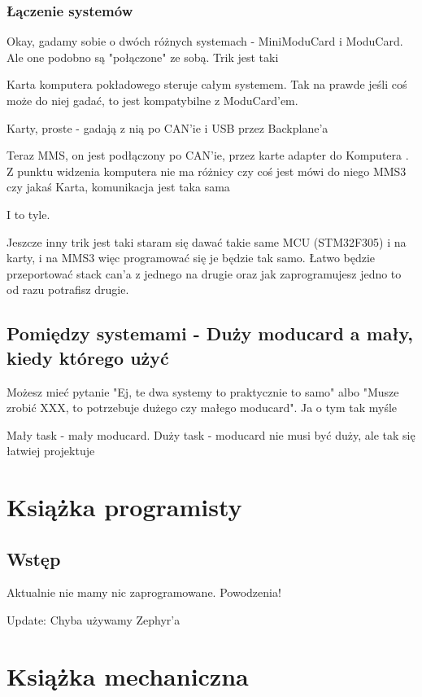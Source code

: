 \documentclass[b5paper, 10pt, twoside]{book}
\begin{document}
\subsection{Łączenie systemów}
Okay, gadamy sobie o dwóch różnych systemach - MiniModuCard i ModuCard. Ale one podobno są "połączone" ze sobą. Trik jest taki

Karta komputera pokładowego steruje całym systemem. Tak na prawde jeśli coś może do niej gadać, to jest kompatybilne z ModuCard'em.

Karty, proste - gadają z nią po CAN'ie i USB przez Backplane'a

Teraz MMS, on jest podłączony po CAN'ie, przez karte adapter do Komputera . Z punktu widzenia komputera nie ma różnicy czy coś jest mówi do niego MMS3 czy jakaś Karta, komunikacja jest taka sama

I to tyle.

Jeszcze inny trik jest taki staram się dawać takie same MCU (STM32F305) i na karty, i na MMS3 więc programować się je będzie tak samo. Łatwo będzie przeportować stack can'a z jednego na drugie oraz jak zaprogramujesz jedno to od razu potrafisz drugie.

\section{Pomiędzy systemami - Duży moducard a mały, kiedy którego użyć} \label{Kiedy_ktorego_uzyc}
Możesz mieć pytanie "Ej, te dwa systemy to praktycznie to samo" albo "Musze zrobić XXX, to potrzebuje dużego czy małego moducard". Ja o tym tak myśle


Mały task - mały moducard. Duży task - moducard nie musi być duży, ale tak się łatwiej projektuje

\chapter{Książka programisty}
\section{Wstęp}
Aktualnie nie mamy nic zaprogramowane. Powodzenia!

Update: Chyba używamy Zephyr'a
\chapter{Książka mechaniczna}
\end{document}

